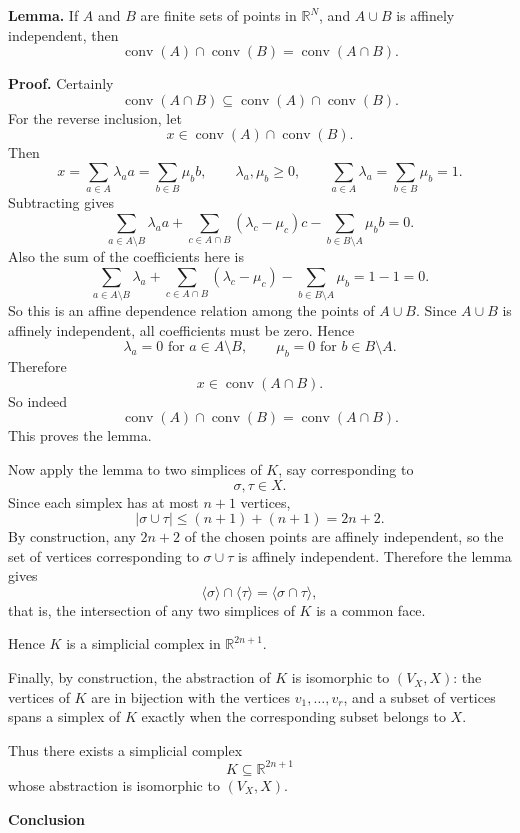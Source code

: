 \begin{solution}
\textbf{Lemma.}
If \(A\) and \(B\) are finite sets of points in \(\mathbb R^N\), and \(A\cup B\) is affinely independent, then
\[
\operatorname{conv}(A)\cap \operatorname{conv}(B)=\operatorname{conv}(A\cap B).
\]

\textbf{Proof.}
Certainly
\[
\operatorname{conv}(A\cap B)\subseteq \operatorname{conv}(A)\cap \operatorname{conv}(B).
\]
For the reverse inclusion, let
\[
x\in \operatorname{conv}(A)\cap \operatorname{conv}(B).
\]
Then
\[
x=\sum_{a\in A}\lambda_a a=\sum_{b\in B}\mu_b b,
\qquad
\lambda_a,\mu_b\ge 0,
\qquad
\sum_{a\in A}\lambda_a=\sum_{b\in B}\mu_b=1.
\]
Subtracting gives
\[
\sum_{a\in A\setminus B}\lambda_a a
+\sum_{c\in A\cap B}(\lambda_c-\mu_c)c
-\sum_{b\in B\setminus A}\mu_b b=0.
\]
Also the sum of the coefficients here is
\[
\sum_{a\in A\setminus B}\lambda_a
+\sum_{c\in A\cap B}(\lambda_c-\mu_c)
-\sum_{b\in B\setminus A}\mu_b
=
1-1=0.
\]
So this is an affine dependence relation among the points of \(A\cup B\). Since \(A\cup B\) is affinely independent, all coefficients must be zero. Hence
\[
\lambda_a=0 \text{ for } a\in A\setminus B,
\qquad
\mu_b=0 \text{ for } b\in B\setminus A.
\]
Therefore
\[
x\in \operatorname{conv}(A\cap B).
\]
So indeed
\[
\operatorname{conv}(A)\cap \operatorname{conv}(B)=\operatorname{conv}(A\cap B).
\]
This proves the lemma.

\par

Now apply the lemma to two simplices of \(K\), say corresponding to
\[
\sigma,\tau\in X.
\]
Since each simplex has at most \(n+1\) vertices,
\[
|\sigma\cup\tau|\le (n+1)+(n+1)=2n+2.
\]
By construction, any \(2n+2\) of the chosen points are affinely independent, so the set of vertices corresponding to \(\sigma\cup\tau\) is affinely independent. Therefore the lemma gives
\[
\langle \sigma\rangle \cap \langle \tau\rangle = \langle \sigma\cap\tau\rangle,
\]
that is, the intersection of any two simplices of \(K\) is a common face.

Hence \(K\) is a simplicial complex in \(\mathbb R^{2n+1}\).

Finally, by construction, the abstraction of \(K\) is isomorphic to \((V_X,X)\): the vertices of \(K\) are in bijection with the vertices \(v_1,\dots,v_r\), and a subset of vertices spans a simplex of \(K\) exactly when the corresponding subset belongs to \(X\).

Thus there exists a simplicial complex
\[
K\subseteq \mathbb R^{2n+1}
\]
whose abstraction is isomorphic to \((V_X,X)\).


\medskip
\noindent\textbf{Conclusion}\par
\smallskip



\end{solution}
